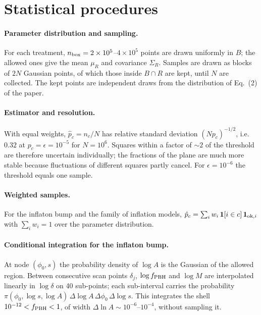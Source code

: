 \documentclass[aps,prd,onecolumn,superscriptaddress,nofootinbib,floatfix]{revtex4-2}
\newcommand{\fpbh}{f_{\rm PBH}}
\begin{document}
\section{Statistical procedures}\label{sec:stat}

\paragraph*{Parameter distribution and sampling.}
For each treatment, $n_{\rm box}=2\times10^5$--$4\times10^5$ points are drawn uniformly in $B$; the allowed ones give the mean $\mu_R$ and covariance $\Sigma_R$. Samples are drawn as blocks of $2N$ Gaussian points, of which those inside $B\cap R$ are kept, until $N$ are collected. The kept points are independent draws from the distribution of Eq.~(2) of the paper.

\paragraph*{Estimator and resolution.}
With equal weights, $\hat p_c=n_c/N$ has relative standard deviation $(Np_c)^{-1/2}$, i.e.\ $0.32$ at $p_c=\epsilon=10^{-5}$ for $N=10^6$. Squares within a factor of $\sim2$ of the threshold are therefore uncertain individually; the fractions of the plane are much more stable because fluctuations of different squares partly cancel. For $\epsilon=10^{-6}$ the threshold equals one sample.

\paragraph*{Weighted samples.}
For the inflaton bump and the family of inflation models, $\hat p_c=\sum_iw_i\,\mathbf{1}[i\in c]\,\mathbf{1}_{{\rm ok},i}$ with $\sum_iw_i=1$ over the parameter distribution.

\paragraph*{Conditional integration for the inflaton bump.}
At node $(\phi_0,s)$ the probability density of $\log A$ is the Gaussian of the allowed region. Between consecutive scan points $\delta_j$, $\log\fpbh$ and $\log M$ are interpolated linearly in $\log\delta$ on 40 sub-points; each sub-interval carries the probability $\pi(\phi_0,\log s,\log A)\,\Delta\log A\,\Delta\phi_0\,\Delta\log s$. This integrates the shell $10^{-12}<\fpbh<1$, of width $\Delta\ln A\sim10^{-6}$--$10^{-4}$, without sampling it.
\end{document}

